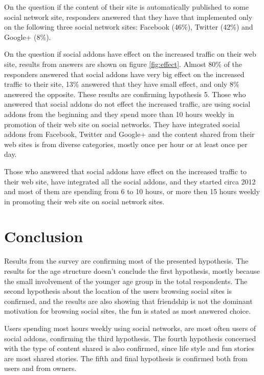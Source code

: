 \documentclass[conference]{IEEEtran}
\begin{document}
On the question if the content of their site is automatically published to some
social network site, responders answered that they have that implemented only on
the following three social network sites: Facebook (46\%), Twitter (42\%) and
Google+ (8\%).

On the question if social addons have effect on the increased traffic on their
web site, results from answers are shown on figure \ref{fig:effect}. Almost 80\%
of the responders answered that social addons have very big effect on the
increased traffic to their site, 13\% answered that they have small effect, and
only 8\% answered the opposite. These results are confirming hypothesis 5. Those
who answered that social addons do not effect the increased traffic, are using
social addons from the beginning and they spend more than 10 hours weekly in
promotion of their web site on social networks. They have integrated social
addons from Facebook, Twitter and Google+ and the content shared from their web
sites is from diverse categories, mostly once per hour or at least once per day.

Those who answered that social addons have effect on the increased traffic to
their web site, have integrated all the social addons, and they started circa
2012 and most of them are spending from 6 to 10 hours, or more then 15 hours
weekly in promoting their web site on social network sites.

\section{Conclusion}

Results from the survey are confirming most of the presented hypothesis. The
results for the age structure doesn't conclude the first hypothesis, mostly
because the small involvement of the younger age group in the total respondents.
The second hypothesis about the location of the users browsing social sites is
confirmed, and the results are also showing that friendship is not the dominant
motivation for browsing social sites, the fun is stated as most answered choice.

Users spending most hours weekly using social networks, are most often users of
social addons, confirming the third hypothesis. The fourth hypothesis concerned
with the type of content shared is also confirmed, since life style and fun
stories are most shared stories. The fifth and final hypothesis is confirmed
both from users and from owners.



\end{document}
